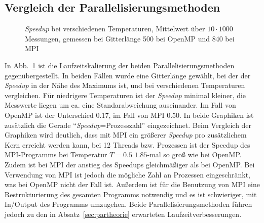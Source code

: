 \subsection{Vergleich der Parallelisierungsmethoden}
%	
	\begin{figure}[htbp]
		
		\caption[\textit{Speedup}  bei verschiedenen Temperaturen]{\textit{Speedup} bei verschiedenen Temperaturen, Mittelwert über $10 \cdot 1000$ Messungen, gemessen bei Gitterlänge 500 bei OpenMP und 840 bei MPI}
		\label{fig:skalierungtemp}
	\end{figure}
	
	In Abb.~\ref{fig:skalierungtemp} ist die Laufzeitskalierung der beiden Parallelisierungsmethoden gegenübergestellt. 
	In beiden Fällen wurde eine Gitterlänge gewählt, bei der der \textit{Speedup} in der Nähe des Maximums ist, und bei verschiedenen Temperaturen vergleichen. Für niedrigere Temperaturen ist der \textit{Speedup} minimal kleiner, die Messwerte liegen um ca.{} eine Standarabweichung auseinander. Im Fall von OpenMP ist der Unterschied $\num{0,17}$, im Fall von MPI $\num{0,50}$. In beide Graphiken ist zusätzlich die Gerade \enquote{\textit{Speedup}=Prozesszahl} eingezeichnet.
	Beim Vergleich der Graphiken wird deutlich, dass mit MPI ein größerer \textit{Speedup} pro zusätzlichem Kern erreicht werden kann, bei 12 Threads bzw. Prozessen ist der Speedup des MPI-Programms bei Temperatur $T=\num{0,5}$ $\num{1,85}$-mal so groß wie bei OpenMP. Zudem ist bei MPI der anstieg des Speedups gleichmäßiger als bei OpenMP. Bei Verwendung von MPI ist jedoch die mögliche Zahl an Prozessen eingeschränkt, was bei OpenMP nicht der Fall ist. Außerdem ist für die Benutzung von MPI eine Restrukturierung des gesamten Programms notwendig und es ist schwieriger, mit In/Output des Programms umzugehen. Beide Parallelisierungsmethoden führen jedoch zu den in Absatz~\ref{sec:partheorie} erwarteten Laufzeitverbesserungen.
%		
	
